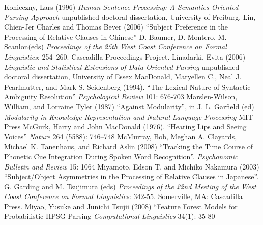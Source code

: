 \documentclass[a4paper]{article}
\begin{document}
\newline
Konieczny, Lars (1996) {\it Human Sentence Processing:
A Semantics-Oriented Parsing Approach} unpublished doctoral dissertation, University of Freiburg.
\newline
\newline
Lin, Chien-Jer Charles  and Thomas Bever (2006) ``Subject Preference in the Processing of Relative Clauses in Chinese'' D. Baumer, D. Montero, M. Scanlon(eds) {\it Proceedings of the 25th West Coast Conference on Formal Linguistics}: 254–260. Cascadilla Proceedings Project.
\newline
\newline
Linadarki, Evita (2006) {\it Linguistic and Statistical Extensions of Data
Oriented Parsing} unpublished doctoral dissertation, University of Essex
\newline
\newline
MacDonald, Maryellen C., 
Neal J. Pearlmutter,
and Mark S. Seidenberg  (1994).  ``The Lexical Nature of Syntactic 
Ambiguity Resolution'' 
{\it Psychological Review} 101: 676-703
\newline
\newline
Marslen-Wilson, William, and Lorraine Tyler (1987) ``Against Modularity'', in J. L.
Garfield (ed) {\it Modularity in Knowledge Representation and Natural Language Processing}
MIT Press
\newline
\newline
McGurk, Harry and John MacDonald (1976). ``Hearing Lips and Seeing Voices'' {\it Nature} 264 (5588): 746–748
\newline
\newline
McMurray, Bob, Meghan A. Clayards, Michael K. Tanenhaus, and Richard Aslin  (2008) ``Tracking the Time Course of Phonetic Cue Integration During Spoken Word Recognition''. {\it Psychonomic Bulletin and Review} 15: 1064
\newline
\newline
Miyamoto, Edson T. and
Michiko Nakamura (2003) ``Subject/Object
Asymmetries
in the Processing
of Relative Clauses
in Japanese''.  G. Garding and M. Tsujimura (eds) {\it Proceedings of the 22nd Meeting of the West Coast Conference on Formal Linguistics}:  342-55. Somerville, MA: 
Cascadilla Press. 
\newline
\newline
Miyao, Yusuke  and Junichi Tsujii (2008) ``Feature Forest Models for
Probabilistic HPSG Parsing  {\it Computational Linguistics} 34(1): 35-80
\newline
\newline
\end{document}

